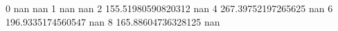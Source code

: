 0 nan nan
1 nan nan
2 155.51980590820312 nan
4 267.39752197265625 nan
6 196.9335174560547 nan
8 165.88604736328125 nan
